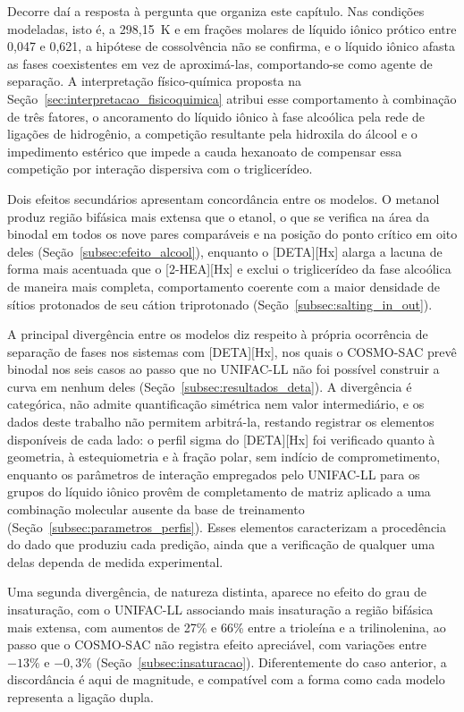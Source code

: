 Decorre daí a resposta à pergunta que organiza este capítulo. Nas condições modeladas, isto é, a 298,15~K e em frações molares de líquido iônico prótico entre 0,047 e 0,621, a hipótese de cossolvência não se confirma, e o líquido iônico afasta as fases coexistentes em vez de aproximá-las, comportando-se como agente de separação. A interpretação físico-química proposta na Seção~\ref{sec:interpretacao_fisicoquimica} atribui esse comportamento à combinação de três fatores, o ancoramento do líquido iônico à fase alcoólica pela rede de ligações de hidrogênio, a competição resultante pela hidroxila do álcool e o impedimento estérico que impede a cauda hexanoato de compensar essa competição por interação dispersiva com o triglicerídeo.

Dois efeitos secundários apresentam concordância entre os modelos. O metanol produz região bifásica mais extensa que o etanol, o que se verifica na área da binodal em todos os nove pares comparáveis e na posição do ponto crítico em oito deles (Seção~\ref{subsec:efeito_alcool}), enquanto o [DETA][Hx] alarga a lacuna de forma mais acentuada que o [2-HEA][Hx] e exclui o triglicerídeo da fase alcoólica de maneira mais completa, comportamento coerente com a maior densidade de sítios protonados de seu cátion triprotonado (Seção~\ref{subsec:salting_in_out}).

A principal divergência entre os modelos diz respeito à própria ocorrência de separação de fases nos sistemas com [DETA][Hx], nos quais o COSMO-SAC prevê binodal nos seis casos ao passo que no UNIFAC-LL não foi possível construir a curva em nenhum deles (Seção~\ref{subsec:resultados_deta}). A divergência é categórica, não admite quantificação simétrica nem valor intermediário, e os dados deste trabalho não permitem arbitrá-la, restando registrar os elementos disponíveis de cada lado: o perfil sigma do [DETA][Hx] foi verificado quanto à geometria, à estequiometria e à fração polar, sem indício de comprometimento, enquanto os parâmetros de interação empregados pelo UNIFAC-LL para os grupos do líquido iônico provêm de completamento de matriz aplicado a uma combinação molecular ausente da base de treinamento (Seção~\ref{subsec:parametros_perfis}). Esses elementos caracterizam a procedência do dado que produziu cada predição, ainda que a verificação de qualquer uma delas dependa de medida experimental.

Uma segunda divergência, de natureza distinta, aparece no efeito do grau de insaturação, com o UNIFAC-LL associando mais insaturação a região bifásica mais extensa, com aumentos de 27\% e 66\% entre a trioleína e a trilinolenina, ao passo que o COSMO-SAC não registra efeito apreciável, com variações entre $-13\%$ e $-0{,}3\%$ (Seção~\ref{subsec:insaturacao}). Diferentemente do caso anterior, a discordância é aqui de magnitude, e compatível com a forma como cada modelo representa a ligação dupla.

